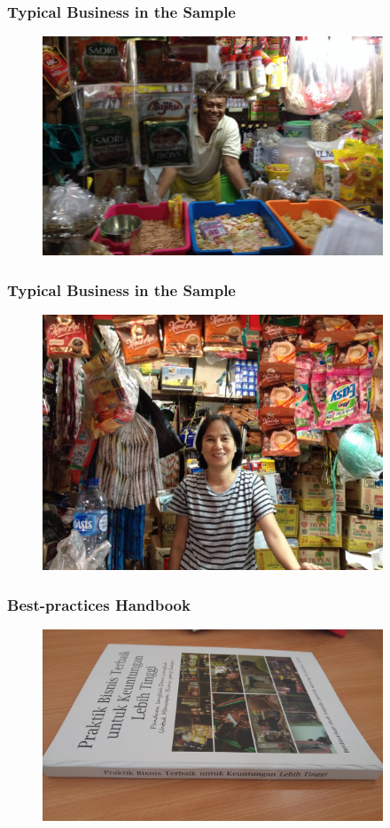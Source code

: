 \documentclass[hideothersubsections, usenames,dvipsnames,11pt]{beamer}
\begin{document}
\begin{frame}
\frametitle{Typical Business in the Sample}

\begin{figure}[htbp]
	\centering
		\includegraphics[width=4in]{pics/retailer1.jpg}
	\label{height}
\end{figure}
\end{frame}

\begin{frame}
\frametitle{Typical Business in the Sample}

\begin{figure}[htbp]
	\centering
		\includegraphics[width=4in]{pics/retailer2.jpg}
	\label{height}
\end{figure}
\end{frame}


\begin{frame}
\frametitle{Best-practices Handbook}

\begin{figure}[htbp]
	\centering
		\includegraphics[width=4in]{pics/handbook.jpg}
	
	\label{height}
\end{figure}
\end{frame}
\end{document}
